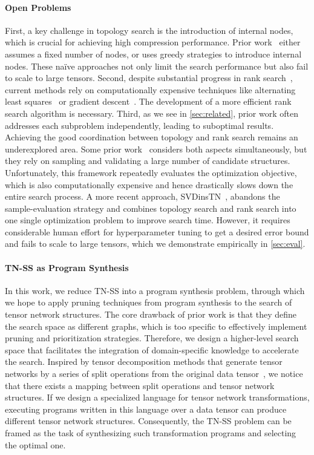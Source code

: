 \paragraph{Open Problems}
%
First, a key challenge in topology search is the introduction of internal nodes, which is crucial for achieving high compression performance.
%
Prior work~\cite{Li_Sun_2020,hashemizadeh2020adaptive} either assumes a fixed number of nodes, or uses greedy strategies to introduce internal nodes.
%
These na\"ive approaches not only limit the search performance but also fail to scale to large tensors.
%
Second, despite substantial progress in rank search~\cite{pmlr-v32-rai14,mickelin2020algorithms,Sedighin2021Adaptive,Yin_Phan_Zang_Liao_Yuan_2022,pmlr-v202-ghadiri23a}, current methods rely on computationally expensive techniques like alternating least squares~\cite{als} or gradient descent~\cite{kolda2020stochastic}.
%
The development of a more efficient rank search algorithm is necessary.
%
Third, as we see in \cref{sec:related}, prior work often addresses each subproblem independently, leading to suboptimal results.
%
Achieving the good coordination between topology and rank search remains an underexplored area.
%
Some prior work~\cite{hashemizadeh2020adaptive,Li_Zeng_Li_Caiafa_Zhao_2023,Li_Zeng_Tao_Zhao_2022,zengtngps} considers both aspects simultaneously, but they rely on sampling and validating a large number of candidate structures.
%
Unfortunately, this framework repeatedly evaluates the optimization objective, which is also computationally expensive and hence drastically slows down the entire search process.
%
A more recent approach, SVDinsTN~\cite{zheng2024svdinstn}, abandons the sample-evaluation strategy and combines topology search and rank search into one single optimization problem to improve search time.
%
However, it requires considerable human effort for hyperparameter tuning to get a desired error bound and fails to scale to large tensors, which we demonstrate empirically in \cref{sec:eval}.
%
\paragraph{TN-SS as Program Synthesis}
%
In this work, we reduce TN-SS into a program synthesis problem, through which we hope to apply pruning techniques from program synthesis to the search of tensor network structures.
%
The core drawback of prior work is that they define the search space as different graphs, which is too specific to effectively implement pruning and prioritization strategies.
%
Therefore, we design a higher-level search space that facilitates the integration of domain-specific knowledge to accelerate the search.
%
Inspired by tensor decomposition methods that generate tensor networks by a series of split operations from the original data tensor~\cite{handschuh2015numerical}, we notice that there exists a mapping between split operations and tensor network structures.
%
If we design a specialized language for tensor network transformations, executing programs written in this language over a data tensor can produce different tensor network structures.
%
Consequently, the TN-SS problem can be framed as the task of synthesizing such transformation programs and selecting the optimal one.
%
